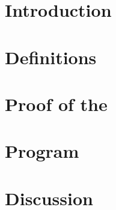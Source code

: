 \documentclass[a4,fleqn]{article}
\begin{document}
\section{Introduction}


\section{Definitions}


\section{Proof of the \MWT}


\section{Program}


\section{Discussion}
\end{document}
